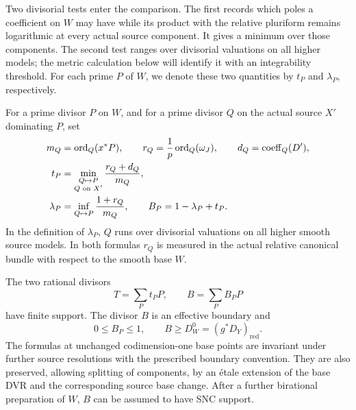 Two divisorial tests enter the comparison. The first records which
poles a coefficient on $W$ may have while its product with the
relative pluriform remains logarithmic at every actual source
component. It gives a minimum over those components. The second
test ranges over divisorial valuations on all higher models; the
metric calculation below will identify it with an integrability
threshold. For each prime $P$ of $W$, we denote these two quantities
by $t_P$ and $\lambda_P$, respectively.

\begin{proposition}
\label{ro:divisors}
For a prime divisor $P$ on $W$, and for a prime divisor $Q$ on the actual
source $X'$ dominating $P$, set
\begin{equation}
 \begin{aligned}
 m_Q&=\operatorname{ord}_Q(x^*P),\qquad
 r_Q=\frac1p\operatorname{ord}_Q(\omega_J),\qquad
 d_Q=\operatorname{coeff}_Q(D'),\\
 t_P&=\min_{\substack{Q\mapsto P\\Q\text{ on }X'}}
                   \frac{r_Q+d_Q}{m_Q},\\
 \lambda_P&=\inf_{Q\mapsto P}\frac{1+r_Q}{m_Q},\qquad
 B_P=1-\lambda_P+t_P.
 \end{aligned}
 \label{ro:orders}
\end{equation}
In the definition of $\lambda_P$, $Q$ runs over divisorial valuations on all higher
smooth source models.  In both formulas $r_Q$ is measured in the actual
relative canonical bundle with respect to the smooth base $W$.

The two rational divisors
\[
 T=\sum_Pt_PP,
 \qquad B=\sum_PB_PP
\]
have finite support.  The divisor $B$ is an effective boundary and
\begin{equation}
 0\le B_P\le1,
 \qquad B\ge D_W^0=(g^*D_Y)_{\mathrm{red}}.
 \label{ro:boundary}
\end{equation}
The formulas at unchanged codimension-one base points are invariant
under further source resolutions with the prescribed boundary
convention.  They are also preserved, allowing splitting of components,
by an \'etale extension of the base DVR and the corresponding source
base change.  After a further birational preparation of $W$, $B$ can be
assumed to have SNC support.
\end{proposition}

